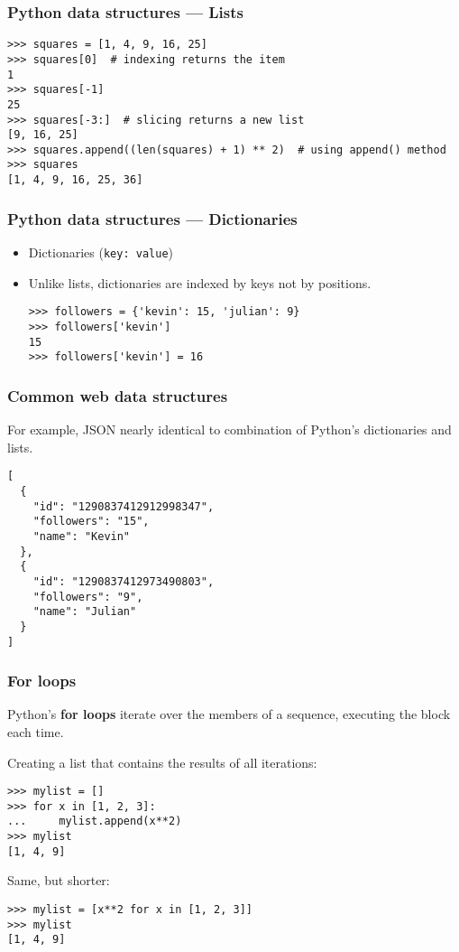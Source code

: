 \begin{frame}[fragile]
    \frametitle{Python data structures --- Lists}
\begin{verbatim}
>>> squares = [1, 4, 9, 16, 25]
>>> squares[0]  # indexing returns the item
1
>>> squares[-1]
25
>>> squares[-3:]  # slicing returns a new list
[9, 16, 25]
>>> squares.append((len(squares) + 1) ** 2)  # using append() method
>>> squares
[1, 4, 9, 16, 25, 36]
\end{verbatim}
\end{frame}

\begin{frame}[fragile]
    \frametitle{Python data structures --- Dictionaries}
    \begin{itemize}
        \item Dictionaries (\texttt{key: value})\\
        \item Unlike lists, dictionaries are indexed by keys not by positions.
\begin{verbatim}
>>> followers = {'kevin': 15, 'julian': 9}
>>> followers['kevin']
15
>>> followers['kevin'] = 16
\end{verbatim}
    \end{itemize}
\end{frame}

\begin{frame}[fragile]
    \frametitle{Common web data structures}
        For example, JSON nearly identical to combination of Python's dictionaries and lists.
\begin{verbatim}
[
  {
    "id": "1290837412912998347",
    "followers": "15",
    "name": "Kevin"
  },
  {
    "id": "1290837412973490803",
    "followers": "9",
    "name": "Julian"
  }
]
\end{verbatim}
\end{frame}

\begin{frame}[fragile]
    \frametitle{For loops}

    Python's \textbf{for loops} iterate over the members of a
    sequence, executing the block each time.

    Creating a list that contains the results of all iterations:

\begin{verbatim}
>>> mylist = []
>>> for x in [1, 2, 3]:
...     mylist.append(x**2)
>>> mylist
[1, 4, 9]
\end{verbatim}

    Same, but shorter:

\begin{verbatim}
>>> mylist = [x**2 for x in [1, 2, 3]]
>>> mylist
[1, 4, 9]
\end{verbatim}
\end{frame}

